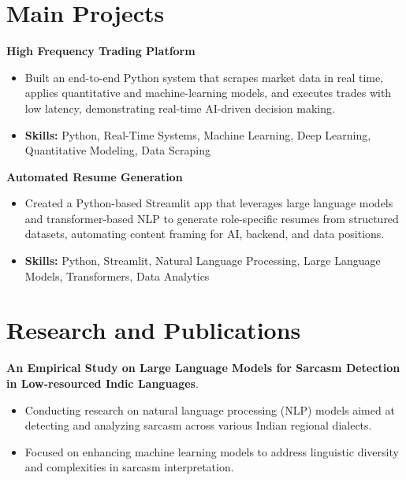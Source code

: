 \documentclass[a4paper,11pt]{article}
\begin{document}
\section{\textbf{Main Projects}}

\vspace{1mm}
  \textbf{High Frequency Trading Platform  }
\vspace{-1.5mm} %
\begin{itemize}
  \item Built an end-to-end Python system that scrapes market data in real time, applies quantitative and machine-learning models, and executes trades with low latency, demonstrating real-time AI-driven decision making.
\vspace{-3mm}
  \item \textbf{Skills:} Python, Real-Time Systems, Machine Learning, Deep Learning, Quantitative Modeling, Data Scraping
\end{itemize}


\vspace{1mm}
   \textbf{Automated Resume Generation }
\vspace{-1.5mm} %
\begin{itemize}
  \item Created a Python-based Streamlit app that leverages large language models and transformer-based NLP to generate role-specific resumes from structured datasets, automating content framing for AI, backend, and data positions.
\vspace{-3mm}
  \item \textbf{Skills:} Python, Streamlit, Natural Language Processing, Large Language Models, Transformers, Data Analytics
\end{itemize}



\section{\textbf{Research and Publications} \hfill }
\vspace{1mm}
  \textbf{An Empirical Study on Large Language Models for Sarcasm Detection in Low-resourced Indic Languages}.
\vspace{-1mm} %
\begin{itemize}
  \item Conducting research on natural language processing (NLP) models aimed at detecting and analyzing sarcasm across various Indian regional dialects.
\vspace{-3mm}
  \item Focused on enhancing machine learning models to address linguistic diversity and complexities in sarcasm interpretation.
\end{itemize}
\end{document}
